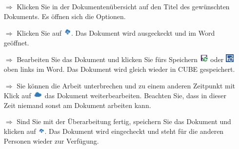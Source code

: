\documentclass{article}
\begin{document}
\begin{multicols}{2}

\begin{tcolorbox}[colback=blue!5,colframe=blue!40!black,title=Bearbeiten von Dokumenten]
\begin{itemize}
  \item[$\Longrightarrow$] Klicken Sie in der Dokumentenübersicht auf den Titel des gewünschten Dokuments. Es öffnen sich die Optionen.
  \item[$\Longrightarrow$] Klicken Sie auf \includegraphics[height=12pt]{Icons/Auschecken.jpg}. Das Dokument wird ausgeckeckt und im Word geöffnet.
  \item[$\Longrightarrow$] Bearbeiten Sie das Dokument und klicken Sie fürs Speichern \includegraphics[height=12pt]{Icons/Sync2013.jpg} oder \includegraphics[height=12pt]{Icons/Sync2016.jpg} oben links im Word. Das Dokument wird gleich wieder in CUBE gespeichert.
  \item[$\Longrightarrow$] Sie können die Arbeit unterbrechen und zu einem anderen Zeitpunkt mit Klick auf \includegraphics[height=12pt]{Icons/Wolke_blauklein.jpg} das Dokument weiterbearbeiten. Beachten Sie, dass in dieser Zeit niemand sonst am Dokument arbeiten kann.
	\item[$\Longrightarrow$] Sind Sie mit der Überarbeitung fertig, speichern Sie das Dokument und klicken auf  \includegraphics[height=10pt]{Icons/Einchecken.jpg}. Das Dokument wird eingecheckt und steht für die anderen Personen wieder zur Verfügung.
\end{itemize}
\end{tcolorbox}



\end{multicols}
\end{document}
